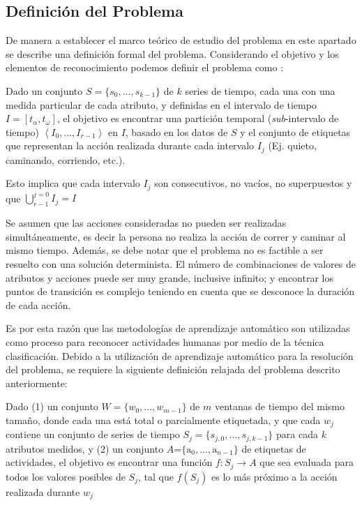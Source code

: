 \subsection{Definición del Problema}

\label{sec261:definicion-har}De manera a establecer el marco teórico
de estudio del problema  en este apartado se describe una
definición formal del problema. Considerando el objetivo y los elementos
de reconocimiento podemos definir el problema como \cite{LaraLabrador2013}:

\begin{definition}\label{def2:harp}Dado un conjunto
$S=\{s_{0},...,s_{k-1}\}$ de $k$ series de tiempo, cada una con
una medida particular de cada atributo, y definidas en el intervalo
de tiempo $I=\left[t_{\alpha},t_{\omega}\right]$, el objetivo es
encontrar una partición temporal (\emph{sub}-intervalo de tiempo)
$\left\langle I_{0},...,I_{r-1}\right\rangle $ en $I$, basado en
los datos de $S$ y el conjunto de etiquetas que representan la acción
realizada durante cada intervalo $I_{j}$ (Ej. quieto, caminando,
corriendo, etc.). 

Esto implica que cada intervalo $I_{j}$ son consecutivos, no vacíos,
no superpuestos y que ${\displaystyle \bigcup_{r-1}^{j=0}{I_{j}=I}}$
\end{definition}

Se asumen que las acciones consideradas no pueden ser realizadas simultáneamente,
es decir la persona no realiza la acción de correr y caminar al mismo
tiempo. Además, se debe notar que el problema  no es factible
a ser resuelto con una solución determinista. El número de combinaciones
de valores de atributos y acciones puede ser muy grande, inclusive
infinito; y encontrar los puntos de transición es complejo teniendo
en cuenta que se desconoce la duración de cada acción. 

Es por esta razón que las metodologías de aprendizaje automático son
utilizadas como proceso para reconocer actividades humanas por medio
de la técnica clasificación. Debido a la utilización de aprendizaje
automático para la resolución del problema, se requiere la siguiente
definición relajada del problema  descrito anteriormente: 

\begin{definition}\label{def2:harp-rel}Dado
(1) un conjunto $W=\{w_{0},...,w_{m-1}\}$ de $m$ ventanas de tiempo
del mismo tamaño, donde cada una está total o parcialmente etiquetada,
y que cada $w_{j}$ contiene un conjunto de series de tiempo $S_{j}=\{s_{j,0},...,s_{j,k-1}\}$
para cada $k$ atributos medidos, y (2) un conjunto $A\text{=}\{\mathrm{a}_{0},...,\mathrm{a}_{n-1}\}$
de etiquetas de actividades, el objetivo es encontrar una función
$f\colon S_{j}\rightarrow A$ que sea evaluada para todos los valores
posibles de $S_{j}$, tal que $f(S_{j})$ es lo más próximo a la acción
realizada durante $w_{j}$ \end{definition}

